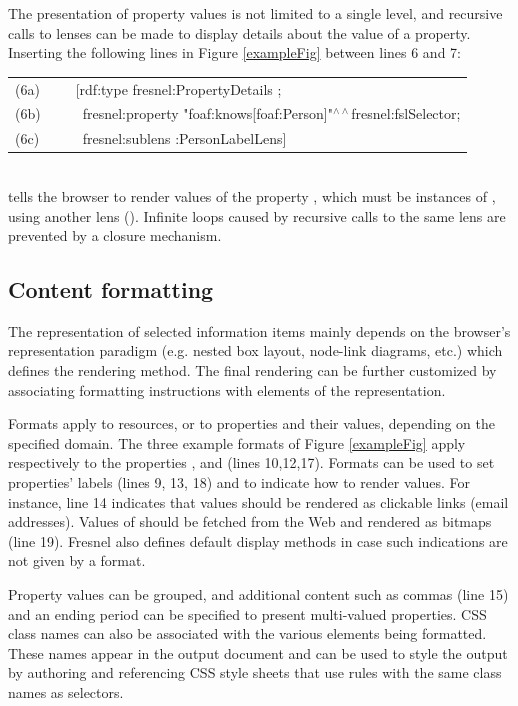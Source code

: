 The presentation of property values is not limited to a single level, and recursive calls to lenses can be made to display details about the value of a property. Inserting the following lines in Figure \ref{exampleFig} between lines 6 and 7:\\
\begin{small}
\begin{tt}
\begin{tabular}{ll}
(6a) & ~~~[rdf:type fresnel:PropertyDetails ;\\
(6b) & ~~~~fresnel:property "foaf:knows[foaf:Person]"$^{\wedge\wedge}$fresnel:fslSelector;\\
(6c) & ~~~~fresnel:sublens :PersonLabelLens]\\
\end{tabular}
\end{tt}
\end{small}
\\tells the browser to render values of the property , which must be instances of , using another lens (). Infinite loops cau\-sed by recursive calls to the same lens are prevented by a closure mechanism.

\subsection{Content formatting}

The representation of selected information items mainly depends on the browser's representation paradigm (e.g. nested box layout, node-link diagrams, etc.) which defines the rendering method. The final rendering can be further customized by associating formatting instructions with elements of the representation.

Formats apply to resources, or to properties and their values, depending on the specified domain. The three example formats of Figure \ref{exampleFig} apply respectively to the properties ,  and  (lines 10,12,17). Formats can be used to set properties' labels (lines 9, 13, 18) and to indicate how to render values. For instance, line 14 indicates that  values should be rendered as clickable links (email addresses). Values of  should be fetched from the Web and rendered as bitmaps (line 19). Fresnel also defines default display methods in case such indications are not given by a format.

Property values can be grouped, and additional content such as commas (line 15) and an ending period can be specified to present multi-valued properties. CSS class names can also be associated with the various elements being formatted. These names appear in the output document and can be used to style the output by authoring and referencing CSS style sheets that use rules with the same class names as selectors.

